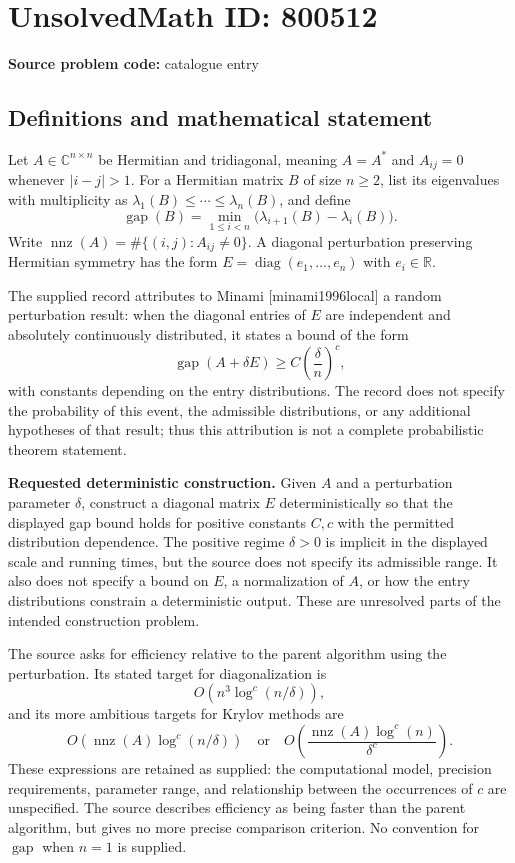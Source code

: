 \documentclass[11pt]{article}
\newcommand{\R}{\mathbb{R}}
\newcommand{\C}{\mathbb{C}}
\begin{document}
\section*{UnsolvedMath ID: 800512}
\textbf{Source problem code:} catalogue entry
\subsection{Definitions and mathematical statement}
Let \(A\in\C^{n\times n}\) be Hermitian and tridiagonal, meaning \(A=A^*\) and \(A_{ij}=0\) whenever \(|i-j|>1\). For a Hermitian matrix \(B\) of size \(n\ge2\), list its eigenvalues with multiplicity as \(\lambda_1(B)\le\cdots\le\lambda_n(B)\), and define
\[
\operatorname{gap}(B)=\min_{1\le i<n}\bigl(\lambda_{i+1}(B)-\lambda_i(B)\bigr).
\]
Write \(\operatorname{nnz}(A)=\#\{(i,j):A_{ij}\ne0\}\). A diagonal perturbation preserving Hermitian symmetry has the form \(E=\operatorname{diag}(e_1,\ldots,e_n)\) with \(e_i\in\R\).

The supplied record attributes to Minami [minami1996local] a random perturbation result: when the diagonal entries of \(E\) are independent and absolutely continuously distributed, it states a bound of the form
\[
\operatorname{gap}(A+\delta E)\ge C\left(\frac{\delta}{n}\right)^c,
\]
with constants depending on the entry distributions. The record does not specify the probability of this event, the admissible distributions, or any additional hypotheses of that result; thus this attribution is not a complete probabilistic theorem statement.

\textbf{Requested deterministic construction.} Given \(A\) and a perturbation parameter \(\delta\), construct a diagonal matrix \(E\) deterministically so that the displayed gap bound holds for positive constants \(C,c\) with the permitted distribution dependence. The positive regime \(\delta>0\) is implicit in the displayed scale and running times, but the source does not specify its admissible range. It also does not specify a bound on \(E\), a normalization of \(A\), or how the entry distributions constrain a deterministic output. These are unresolved parts of the intended construction problem.

The source asks for efficiency relative to the parent algorithm using the perturbation. Its stated target for diagonalization is
\[
O\!\left(n^3\log^c(n/\delta)\right),
\]
and its more ambitious targets for Krylov methods are
\[
O\!\left(\operatorname{nnz}(A)\log^c(n/\delta)\right)
\quad\text{or}\quad
O\!\left(\frac{\operatorname{nnz}(A)\log^c(n)}{\delta^c}\right).
\]
These expressions are retained as supplied: the computational model, precision requirements, parameter range, and relationship between the occurrences of \(c\) are unspecified. The source describes efficiency as being faster than the parent algorithm, but gives no more precise comparison criterion. No convention for \(\operatorname{gap}\) when \(n=1\) is supplied.
\end{document}
